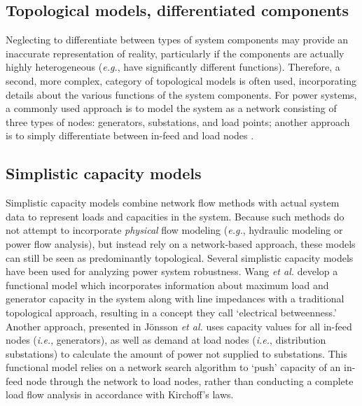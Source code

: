 \subsection{Topological models, differentiated components}
\label{sec:ch3:models:diftopoo}

Neglecting to differentiate between types of system components may provide an inaccurate representation of reality, particularly if the components are actually highly heterogeneous (\emph{e.g.}, have significantly different functions). Therefore, a second, more complex, category of topological models is often used, incorporating details about the various functions of the system components.  For power systems, a commonly used approach is to model the system as a network consisting of three types of nodes: generators, substations, and load points; another approach is to simply differentiate between in-feed and load nodes \cite{Albert2004, Holmgren2006a, Duenas-Osorio2009, Winkler2010}.


\subsection{Simplistic capacity models}
\label{sec:ch3:models:capacity}

Simplistic capacity models combine network flow methods with actual system data to represent loads and capacities in the system.  Because such methods do not attempt to incorporate \emph{physical} flow modeling (\emph{e.g.}, hydraulic modeling or power flow analysis), but instead rely on a network-based approach, these models can still be seen as predominantly topological. Several simplistic capacity models have been used for analyzing power system robustness. Wang \emph{et al.} \cite{Wang2011} develop a functional model which incorporates information about maximum load and generator capacity in the system along with line impedances with a traditional topological approach, resulting in a concept they call `electrical betweenness.'  Another approach, presented in J\"{o}nsson \emph{et al.} \cite{Jonsson2008} uses capacity values for all in-feed nodes (\emph{i.e.}, generators), as well as demand at load nodes (\emph{i.e.}, distribution substations) to calculate the amount of power not supplied to substations.  This functional model relies on a network search algorithm to `push' capacity of an in-feed node through the network to load nodes, rather than conducting a complete load flow analysis in accordance with Kirchoff's laws.

